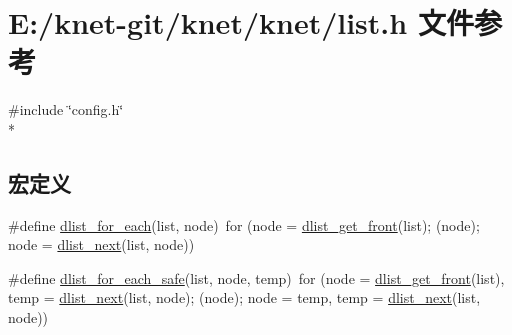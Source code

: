 \hypertarget{a00049}{}\section{E\+:/knet-\/git/knet/knet/list.h 文件参考}
\label{a00049}
{\ttfamily \#include \char`\"{}config.\+h\char`\"{}}\\*
\subsection*{宏定义}
\begin{DoxyCompactItemize}
\item 
\#define \hyperlink{a00049_a74abc436128d57c9cce4bb6cb4514a30_a74abc436128d57c9cce4bb6cb4514a30}{dlist\+\_\+for\+\_\+each}(list,  node)~for (node = \hyperlink{a00049_aa5e2f24e1971b89ac20f3f1258a41597_aa5e2f24e1971b89ac20f3f1258a41597}{dlist\+\_\+get\+\_\+front}(list); (node); node = \hyperlink{a00049_a2a1c0e5ec8521d7be962798680e283fc_a2a1c0e5ec8521d7be962798680e283fc}{dlist\+\_\+next}(list, node))
\item 
\#define \hyperlink{a00049_a06e8f967efba4722dce2899baaa5c155_a06e8f967efba4722dce2899baaa5c155}{dlist\+\_\+for\+\_\+each\+\_\+safe}(list,  node,  temp)~for (node = \hyperlink{a00049_aa5e2f24e1971b89ac20f3f1258a41597_aa5e2f24e1971b89ac20f3f1258a41597}{dlist\+\_\+get\+\_\+front}(list), temp = \hyperlink{a00049_a2a1c0e5ec8521d7be962798680e283fc_a2a1c0e5ec8521d7be962798680e283fc}{dlist\+\_\+next}(list, node); (node); node = temp, temp = \hyperlink{a00049_a2a1c0e5ec8521d7be962798680e283fc_a2a1c0e5ec8521d7be962798680e283fc}{dlist\+\_\+next}(list, node))
\end{DoxyCompactItemize}
